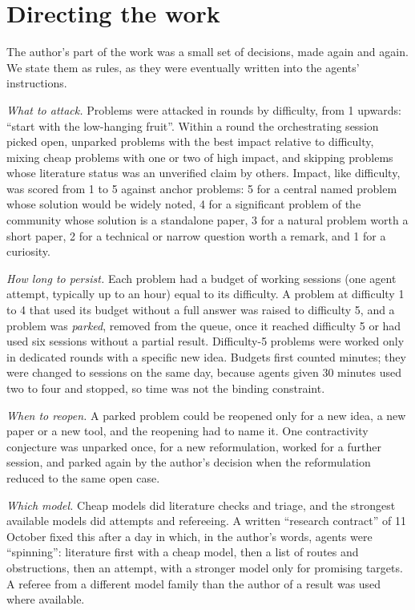 \documentclass[11pt]{amsart}
\newcommand*{\sectionbreak}{\clearpage} %
\begin{document}
\sectionbreak
\section{Directing the work}\label{sec:directing}

The author's part of the work was a small set of decisions, made again and
again. We state them as rules, as they were eventually written into the agents'
instructions.\@

\emph{What to attack.} Problems were attacked in rounds by difficulty, from 1
upwards: ``start with the low-hanging fruit''. Within a round the orchestrating
session picked open, unparked problems with the best impact relative to
difficulty, mixing cheap problems with one or two of high impact, and skipping
problems whose literature status was an unverified claim by others. Impact,
like difficulty, was scored from 1 to 5 against anchor problems: 5 for a
central named problem whose solution would be widely noted, 4 for a significant
problem of the community whose solution is a standalone paper, 3 for a natural
problem worth a short paper, 2 for a technical or narrow question worth a
remark, and 1 for a curiosity.\@

\emph{How long to persist.} Each problem had a budget of working sessions (one
agent attempt, typically up to an hour) equal to its difficulty. A problem at
difficulty 1 to 4 that used its budget without a full answer was raised to
difficulty 5, and a problem was \emph{parked}, removed from the queue, once it
reached difficulty 5 or had used six sessions without a partial result.
Difficulty-5 problems were worked only in dedicated rounds with a specific new
idea. Budgets first counted minutes; they were changed to sessions on the same
day, because agents given 30 minutes used two to four and stopped, so time was
not the binding constraint.\@

\emph{When to reopen.} A parked problem could be reopened only for a new idea,
a new paper or a new tool, and the reopening had to name it. One contractivity
conjecture was unparked once, for a new reformulation, worked for a further
session, and parked again by the author's decision when the reformulation
reduced to the same open case.\@

\emph{Which model.} Cheap models did literature checks and triage, and the
strongest available models did attempts and refereeing. A written ``research
contract'' of 11 October fixed this after a day in which, in the author's
words, agents were ``spinning'': literature first with a cheap model, then a
list of routes and obstructions, then an attempt, with a stronger model only
for promising targets. A referee from a different model family than the author
of a result was used where available.\@
\end{document}
